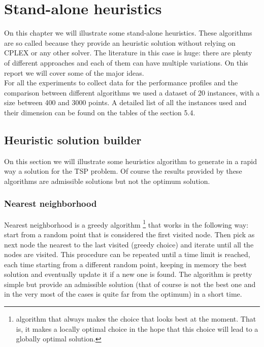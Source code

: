 \chapter{Stand-alone heuristics}
On this chapter we will illustrate some stand-alone heuristics. These algorithms are so called because they provide an heuristic solution without relying on CPLEX or any other solver. The literature in this case is huge: there are plenty of different approaches and each of them can have multiple variations. On this report we will cover some of the major ideas. \\
For all the experiments to collect data for the performance profiles and the comparison between different algorithms we used a dataset of 20 instances, with a size between 400 and 3000 points. A detailed list of all the instances used and their dimension can be found on the tables of the section 5.4.

\section{Heuristic solution builder}
On this section we will illustrate some heuristics algorithm to generate in a rapid way a solution for the TSP problem. Of course the results provided by these algorithms are admissible solutions but not the optimum solution.

\subsection{Nearest neighborhood}
Nearest neighborhood is a greedy algorithm \footnote{algorithm that always makes the choice that looks best at the moment. That is, it makes a locally optimal choice in the hope that this choice
will lead to a globally optimal solution.  %
} that works in the following way: start from a random point that is considered the first visited node. Then pick as next node the nearest to the last visited (greedy choice) and iterate until all the nodes are visited. This procedure can be repeated until a time limit is reached, each time starting from a different random point, keeping in memory the best solution and eventually update it if a new one is found. The algorithm is pretty simple but provide an admissible solution (that of course is not the best one and in the very most of the cases is quite far from the optimum) in a short time. \\

